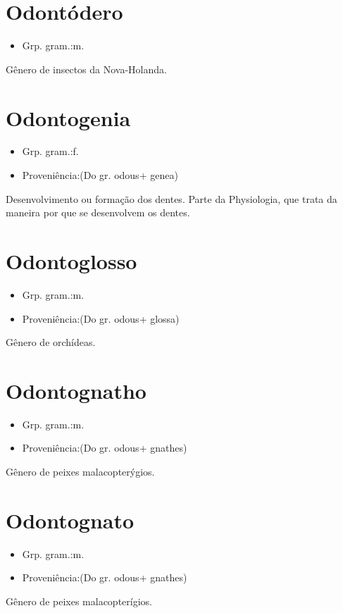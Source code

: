 \section{Odontódero}
\begin{itemize}
\item {Grp. gram.:m.}
\end{itemize}
Gênero de insectos da Nova-Holanda.
\section{Odontogenia}
\begin{itemize}
\item {Grp. gram.:f.}
\end{itemize}
\begin{itemize}
\item {Proveniência:(Do gr. \textunderscore odous\textunderscore  + \textunderscore genea\textunderscore )}
\end{itemize}
Desenvolvimento ou formação dos dentes.
Parte da Physiologia, que trata da maneira por que se desenvolvem os dentes.
\section{Odontoglosso}
\begin{itemize}
\item {Grp. gram.:m.}
\end{itemize}
\begin{itemize}
\item {Proveniência:(Do gr. \textunderscore odous\textunderscore  + \textunderscore glossa\textunderscore )}
\end{itemize}
Gênero de orchídeas.
\section{Odontognatho}
\begin{itemize}
\item {Grp. gram.:m.}
\end{itemize}
\begin{itemize}
\item {Proveniência:(Do gr. \textunderscore odous\textunderscore  + \textunderscore gnathes\textunderscore )}
\end{itemize}
Gênero de peixes malacopterýgios.
\section{Odontognato}
\begin{itemize}
\item {Grp. gram.:m.}
\end{itemize}
\begin{itemize}
\item {Proveniência:(Do gr. \textunderscore odous\textunderscore  + \textunderscore gnathes\textunderscore )}
\end{itemize}
Gênero de peixes malacopterígios.

